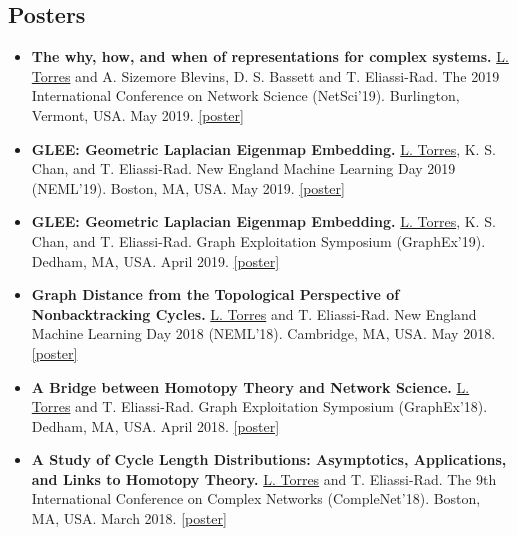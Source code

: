 \documentclass[12pt,]{scrartcl}
\newenvironment{myitemize}
{ \begin{itemize}
    \setlength{\itemsep}{5pt}
    \setlength{\parskip}{0pt}
    \setlength{\parsep}{0pt}     }
{ \end{itemize}                  }
\begin{document}
\subsection{Posters}\label{posters}

\begin{myitemize}
\leftskip-0.25in %

\item \textbf{The why, how, and when of representations for complex systems.} \underline{L. Torres} and A. Sizemore Blevins, D. S. Bassett and T. Eliassi-Rad. The 2019 International Conference on Network Science (NetSci'19). Burlington, Vermont, USA. May 2019. \href{http://leotrs.com/static/hyper_poster.pdf}{[poster]}

\item \textbf{GLEE: Geometric Laplacian Eigenmap Embedding.} \underline{L. Torres}, K. S. Chan, and T. Eliassi-Rad. New England Machine Learning Day 2019 (NEML'19). Boston, MA, USA. May 2019. \href{http://leotrs.com/static/glee_poster.pdf}{[poster]}

\item \textbf{GLEE: Geometric Laplacian Eigenmap Embedding.} \underline{L. Torres}, K. S. Chan, and T. Eliassi-Rad. Graph Exploitation Symposium (GraphEx'19). Dedham, MA, USA. April 2019. \href{http://leotrs.com/static/glee_poster.pdf}{[poster]}

\item \textbf{Graph Distance from the Topological Perspective of Nonbacktracking Cycles.} \underline{L. Torres} and T. Eliassi-Rad. New England Machine Learning Day 2018 (NEML'18). Cambridge, MA, USA. May 2018. \href{http://leotrs.com/static/neml18.pdf}{[poster]}

\item \textbf{A Bridge between Homotopy Theory and Network Science.} \underline{L. Torres} and T. Eliassi-Rad. Graph Exploitation Symposium (GraphEx'18). Dedham, MA, USA. April 2018. \href{http://leotrs.com/static/graphex18.pdf}{[poster]}

\item \textbf{A Study of Cycle Length Distributions: Asymptotics, Applications, and Links to Homotopy Theory.} \underline{L. Torres} and T. Eliassi-Rad. The 9th International Conference on Complex Networks (CompleNet'18). Boston, MA, USA. March 2018. \href{http://leotrs.com/static/complenet18.pdf}{[poster]}

\end{myitemize}
\end{document}
